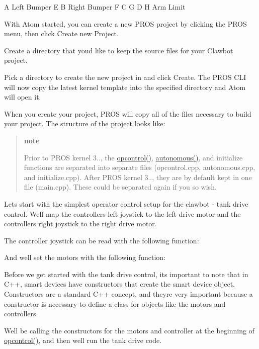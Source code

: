 A Left Bumper E B Right Bumper F C G D H Arm Limit

With Atom started, you can create a new P\+R\+OS project by clicking the {\ttfamily P\+R\+OS} menu, then click {\ttfamily Create new Project}.

Create a directory that you\textquotesingle{}d like to keep the source files for your Clawbot project.

Pick a directory to create the new project in and click Create. The P\+R\+OS C\+LI will now copy the latest kernel template into the specified directory and Atom will open it.

When you create your project, P\+R\+OS will copy all of the files necessary to build your project. The structure of the project looks like\+:

\begin{quote}
{\bfseries note}

Prior to P\+R\+OS kernel 3.., the {\ttfamily \hyperlink{main_8h_a1903abdb5ef0f301d660754c8315fc17}{opcontrol()}}, {\ttfamily \hyperlink{main_8h_a2df3d06bc5bced154da27fce393f991f}{autonomous()}}, and initialize functions are separated into separate files (opcontrol.\+cpp, autonomous.\+cpp, and initialize.\+cpp). After P\+R\+OS kernel 3.., they are by default kept in one file (main.\+cpp). These could be separated again if you so wish. \end{quote}


Let\textquotesingle{}s start with the simplest operator control setup for the clawbot -\/ tank drive control. We\textquotesingle{}ll map the controller\textquotesingle{}s left joystick to the left drive motor and the controller\textquotesingle{}s right joystick to the right drive motor.

The controller joystick can be read with the following function\+:

And we\textquotesingle{}ll set the motors with the following function\+:

Before we get started with the tank drive control, it\textquotesingle{}s important to note that in C++, smart devices have constructors that create the smart device object. Constructors are a standard C++ concept, and they\textquotesingle{}re very important because a constructor is necessary to define a class for objects like the motors and controllers.

We\textquotesingle{}ll be calling the constructors for the motors and controller at the beginning of {\ttfamily \hyperlink{main_8h_a1903abdb5ef0f301d660754c8315fc17}{opcontrol()}}, and then we\textquotesingle{}ll run the tank drive code.

